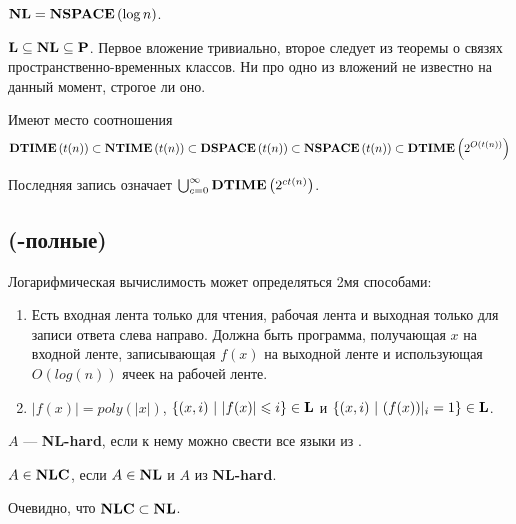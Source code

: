 \begin{definition}
$\textbf{NL} = \textbf{NSPACE}\left({\log n}\right)$.
\end{definition}

\begin{note} $\textbf{L} \subseteq \textbf{NL} \subseteq \textbf{P}$. Первое вложение тривиально, второе следует из теоремы о связях пространственно-временных классов. Ни про одно из вложений не известно на данный момент, строгое ли оно.%
\end{note}

\begin{theorem}
Имеют место соотношения
$$
\textbf{DTIME}\left({t(n)}\right) \subset \textbf{NTIME}\left({t(n)}\right) \subset \textbf{DSPACE}\left({t(n)}\right) \subset \textbf{NSPACE}\left({t(n)}\right) \subset \textbf{DTIME}\left({2^{O(t(n))}}\right)
$$

Последняя запись означает $\bigcup_{c = 0}^{\infty} \textbf{DTIME}\left({2^{ct(n)}}\right)$.
\end{theorem}

\subsection{\nlcsp (\nlsp-полные)}

\begin{definition} Логарифмическая вычислимость может определяться 2мя способами:
\begin{enumerate}
    \item Есть входная лента только для чтения, рабочая лента и выходная только для записи ответа слева направо. Должна быть программа, получающая $x$ на входной ленте, записывающая $f(x)$ на выходной ленте и использующая $O(log(n))$ ячеек на рабочей ленте.
    \item $|f(x)| = poly(|x|)$, $\{(x,i)\ |\ |f(x)| \leqslant i\} \in \textbf{L}$ и $\{(x,i)\ |\ (f(x))|_i = 1 \} \in \textbf{L}$.
\end{enumerate}
\end{definition}

\begin{definition}
$A$ — \textbf{NL-hard}, если к нему можно свести все языки из \nlsp.
\end{definition} 

\begin{definition}
$A \in \textbf{NLC}$, если $A \in \textbf{NL}$ и $A$ из \textbf{NL-hard}.
\end{definition}

\begin{note}
Очевидно, что $\textbf{NLC} \subset \textbf{NL}$.
\end{note}

